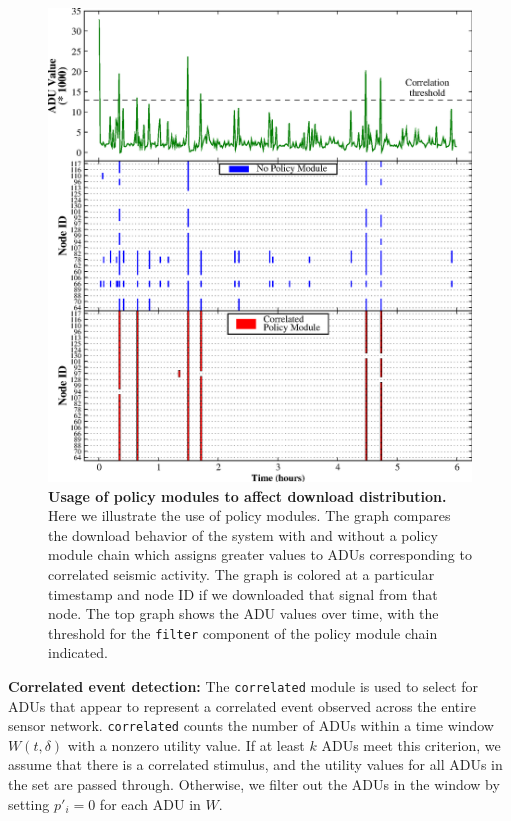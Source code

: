 \begin{figure}[t!]
\begin{center}
\includegraphics[width=1.0\hsize]{./figs/Sensys2008/2008-policy-module-usage.eps}
\end{center}
\caption{{\bf Usage of policy modules to affect download distribution.} 
Here we illustrate the use of policy modules. The graph compares the download
behavior of the system with and without a policy module chain which assigns
greater values to ADUs corresponding to correlated seismic activity.  The
graph is colored at a particular timestamp and node ID if we downloaded that
signal from that node. The top graph shows the ADU values over time, with the
threshold for the \texttt{filter} component of the policy module chain
indicated.}
\label{fig-policy-module-usage}
\end{figure}


{\bf Correlated event detection:}
The {\tt correlated} module is used to 
select for ADUs that appear to represent a correlated
event observed across the entire sensor network. 
{\tt correlated} counts the number of ADUs within a time window
$W(t,\delta)$ with a nonzero utility value.
If at least $k$ ADUs meet this criterion, we assume that there is 
a correlated stimulus, and the utility values for all ADUs in 
the set are passed through.  Otherwise, we filter out the ADUs in 
the window by setting $p'_i = 0$ for each ADU in $W$.

